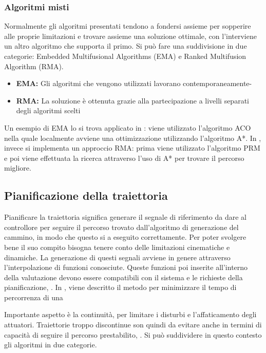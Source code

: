 \subsubsection{Algoritmi misti}
Normalmente gli algoritmi presentati tendono a fondersi assieme per sopperire alle proprie limitazioni e trovare assieme una soluzione ottimale, con l'interviene un altro algoritmo che supporta il primo. Si può fare una suddivisione in due categorie: Embedded Multifusional Algorithms (EMA) e Ranked Multifusion Algorithm (RMA).
\begin{itemize}
	\item \textbf{EMA:} Gli algoritmi che vengono utilizzati lavorano contemporaneamente-
	\item \textbf{RMA:} La soluzione è ottenuta grazie alla partecipazione a livelli separati degli algoritmi scelti
\end{itemize}
Un esempio di EMA lo si trova applicato in \cite{SaberAhmedYousuf2008Sucb}: viene utilizzato l'algoritmo ACO nella quale localmente avviene una ottimizzazione utilizzando l'algoritmo A*.
In \cite{FeiYanYi-ShaLiuJi-ZhongXiao2013PPiC}, invece si implementa un approccio RMA: prima viene utilizzato l'algoritmo PRM e poi viene effettuata la ricerca attraverso l'uso di A* per trovare il percorso migliore.


\subsection{Pianificazione della traiettoria}
Pianificare la traiettoria significa generare il segnale di riferimento da dare al controllore per seguire il percorso trovato dall'algoritmo di generazione del cammino, in modo che questo si a eseguito correttamente. Per poter svolgere bene il suo compito bisogna tenere conto delle limitazioni cinematiche e dinamiche. La generazione di questi segnali avviene in genere attraverso l'interpolazione di funzioni conosciute. Queste funzioni poi inserite all'interno della valutazione devono essere compatibili con il sistema e le richieste della pianificazione, \cite{PathPlannigOverview}.
In \cite{BobrowJ.E2016TCoR}, viene descritto il metodo per minimizzare il tempo di percorrenza di una 

Importante aspetto è la continuità, per limitare i disturbi e l'affaticamento degli attuatori. Traiettorie troppo discontinue son quindi da evitare anche in termini di capacità di seguire il percorso prestabilito, \cite{PathPlannigOverview}.
Si può suddividere in questo contesto gli algoritmi in due categorie.
